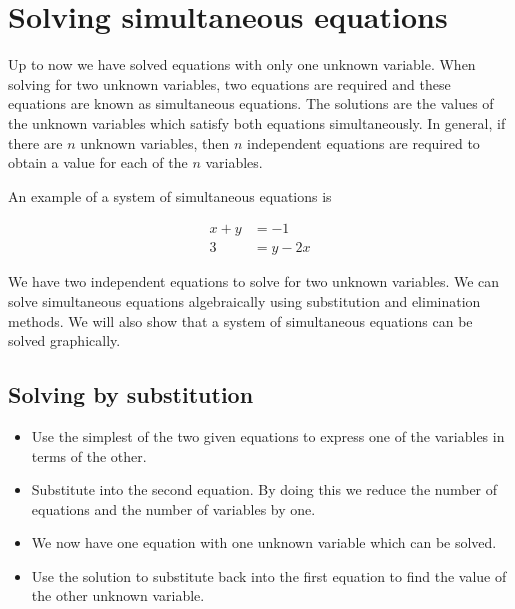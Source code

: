 \section{Solving simultaneous equations}

Up to now we have solved equations with only one unknown variable. 
When solving for two unknown variables, two equations are required and these equations are known as simultaneous equations. 
The solutions are the values of the unknown variables which satisfy both equations simultaneously. In general, if there are $n$ unknown variables, then $n$ independent equations are required to obtain a value for each of the $n$ variables.\par 
An example of a system of simultaneous equations is

\begin{align*}
  x+y &= -1 \\ 
  3 &= y-2x
\end{align*}

We have two independent equations to solve for two unknown variables. We can solve simultaneous equations algebraically using substitution and elimination methods. We will also show that a system of simultaneous equations can be solved graphically.\par 
\par
{}

\subsection*{Solving by substitution}
\begin{itemize}
 \item Use the simplest of the two given equations to express one of the variables in terms of the other.
\item Substitute into the second equation. By doing this we reduce the number of equations and the number of variables by one.
\item We now have one equation with one unknown variable which can be solved.
\item Use the solution to substitute back into the first equation to find the value of the other unknown variable.
\end{itemize}

